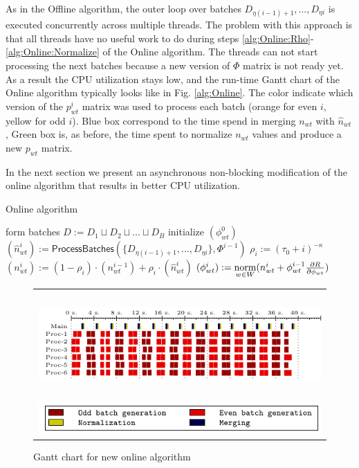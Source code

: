 \documentclass[russian,english]{llncs}
\newcommand{\norm}{\mathop{\rm norm}\limits}
\newcommand{\kw}[1]{\textsf{#1}}
\begin{document}
As in the \kw{Offline algorithm}, the outer loop over batches
$D_{\eta (i - 1) + 1}, \dots, D_{\eta i}$ is executed concurrently across multiple threads.
The problem with this approach is that all threads have no useful work to do during steps
\ref{alg:Online:Rho}-\ref{alg:Online:Normalize} of the \kw{Online algorithm}.
The threads can not start processing the next batches because a new version of $\Phi$ matrix is not ready yet.
As a result the CPU utilization stays low, and the run-time Gantt chart of the \kw{Online algorithm} typically looks like in Fig. \ref{alg:Online}.
The color indicate which version of the $p^i_{wt}$ matrix was used to process each batch
(orange for even $i$, yellow for odd $i$).
Blue box correspond to the time spend in merging $n_{wt}$ with $\hat n_{wt}$,
Green box is, as before, the time spent to normalize $n_{wt}$ values and produce a new $p_{wt}$ matrix.

In the next section we present an asynchronous non-blocking modification of the online algorithm that results in better CPU utilization.

\SetAlgoSkip{}
\begin{algorithm2e}[h]
\caption{Online algorithm} %
\label{alg:Online}
\BlankLine
{}
\BlankLine
form batches $D := D_1 \sqcup D_2 \sqcup \dots \sqcup D_B$\;
initialize $(\phi^0_{wt})$\;
 {
    $(\hat n^i_{wt}) := \kw{ProcessBatches}(\{D_{\eta (i - 1) + 1}, \dots, D_{\eta i}\}, \Phi^{i - 1})$\;
    $\rho_i := (\tau_0 + i)^{-\kappa}$\;
    \label{alg:Online:Rho}
    $(n^{i}_{wt}) := (1 - \rho_i) \cdot (n^{i-1}_{wt}) + \rho_i \cdot (\hat n^{i}_{wt})$\;
    \label{alg:Online:Merge}
    $(\phi^{i}_{wt}) := \norm_{w \in W} (n^{i}_{wt} + \phi^{i - 1}_{wt} \frac{\partial R}{\partial \phi_{wt}})$\;
    \label{alg:Online:Normalize}
}
\end{algorithm2e}

\begin{figure}[t]
	\centering
	\begin{tabular}{c}
		\includegraphics[height=4cm, width=12cm]{plots/plot_nytimes_non_async_200.pdf} \\
		\includegraphics[scale=1]{plots/plot_legend_async_non_async.pdf}
	\end{tabular}
	\caption{Gantt chart for new online algorithm} \label{fig:gantt:online}
\end{figure}
\end{document}

